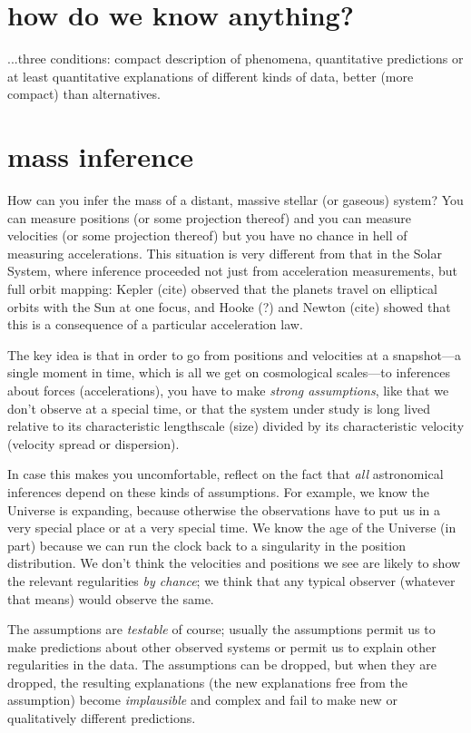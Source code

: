 \documentclass[12pt]{article}
\begin{document}
\section{how do we know anything?}

...three conditions: compact description of phenomena, quantitative
predictions or at least quantitative explanations of different kinds
of data, better (more compact) than alternatives.

\section{mass inference}

How can you infer the mass of a distant, massive stellar (or gaseous)
system?  You can measure positions (or some projection thereof) and
you can measure velocities (or some projection thereof) but you have
no chance in hell of measuring accelerations.  This situation is very
different from that in the Solar System, where inference proceeded not
just from acceleration measurements, but full orbit mapping: Kepler
(cite) observed that the planets travel on elliptical orbits with the
Sun at one focus, and Hooke (?) and Newton (cite) showed that this is
a consequence of a particular acceleration law.

The key idea is that in order to go from positions and velocities at a
snapshot---a single moment in time, which is all we get on
cosmological scales---to inferences about forces (accelerations), you
have to make \emph{strong assumptions}, like that we don't observe at
a special time, or that the system under study is long lived relative
to its characteristic lengthscale (size) divided by its characteristic
velocity (velocity spread or dispersion).

In case this makes you uncomfortable, reflect on the fact that
\emph{all} astronomical inferences depend on these kinds of
assumptions.  For example, we know the Universe is expanding, because
otherwise the observations have to put us in a very special place or
at a very special time.  We know the age of the Universe (in part)
because we can run the clock back to a singularity in the position
distribution.  We don't think the velocities and positions we see are
likely to show the relevant regularities \emph{by chance}; we think
that any typical observer (whatever that means) would observe the
same.

The assumptions are \emph{testable} of course; usually the assumptions
permit us to make predictions about other observed systems or permit
us to explain other regularities in the data.  The assumptions can be
dropped, but when they are dropped, the resulting explanations (the
new explanations free from the assumption) become \emph{implausible}
and complex and fail to make new or qualitatively different
predictions.
\end{document}
